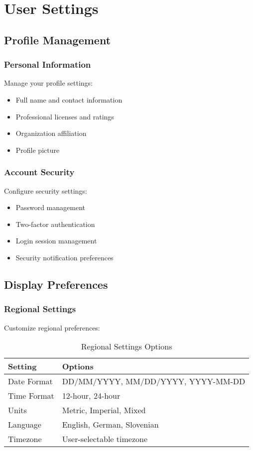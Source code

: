 \chapter{User Settings}

\section{Profile Management}

\subsection{Personal Information}

Manage your profile settings:

\begin{itemize}
    \item Full name and contact information
    \item Professional licenses and ratings
    \item Organization affiliation
    \item Profile picture
\end{itemize}

\subsection{Account Security}

Configure security settings:

\begin{itemize}
    \item Password management
    \item Two-factor authentication
    \item Login session management
    \item Security notification preferences
\end{itemize}

\section{Display Preferences}

\subsection{Regional Settings}

Customize regional preferences:

\begin{table}[H]
\centering
\begin{tabular}{@{}ll@{}}
\toprule
\textbf{Setting} & \textbf{Options} \\
\midrule
Date Format & DD/MM/YYYY, MM/DD/YYYY, YYYY-MM-DD \\
Time Format & 12-hour, 24-hour \\
Units & Metric, Imperial, Mixed \\
Language & English, German, Slovenian \\
Timezone & User-selectable timezone \\
\bottomrule
\end{tabular}
\caption{Regional Settings Options}
\label{tab:regional_settings}
\end{table}

